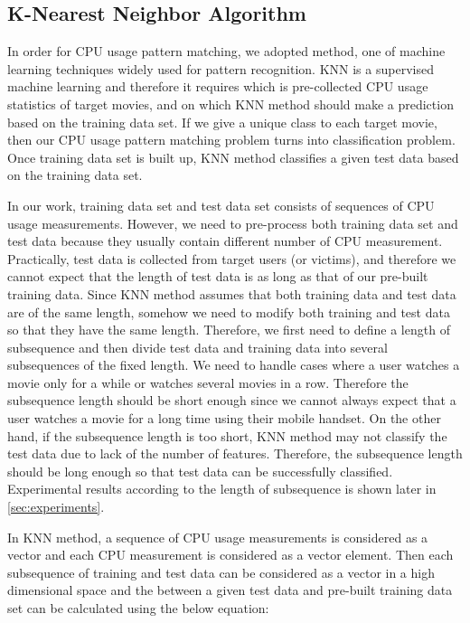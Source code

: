 \subsection{K-Nearest Neighbor Algorithm}
\label{sec:knn} 

In order for CPU usage pattern matching, we adopted  method, one of machine learning techniques widely used for pattern recognition.
KNN is a supervised machine learning and therefore it requires  which is pre-collected CPU usage statistics of target movies, and  on which KNN method should make a prediction based on the training data set.
If we give a unique class to each target movie, then our CPU usage pattern matching problem turns into classification problem. 
Once training data set is built up,  KNN method classifies a given test data based on the training data set. 

In our work, training data set and test data set consists of sequences of CPU usage measurements. 
However, we need to pre-process both training data set and test data because they usually contain different number of CPU measurement.
Practically, test data is collected from target users (or victims), and therefore we cannot expect that the length of test data is as long as that of our pre-built training data. 
Since KNN method assumes that both training data and test data are of the same length, somehow we need to modify both training and test data so that they have the same length. 
Therefore, we first need to define a length of subsequence and then divide test data and training data into several subsequences of the fixed length. 
We need to handle cases where a user watches a movie only for a while or watches several movies in a row. 
Therefore the subsequence length should be short enough since we cannot always expect that a user watches a movie for a long time using their mobile handset.  
On the other hand, if the subsequence length is too short, KNN method may not classify the test data due to lack of the number of features. 
Therefore, the subsequence length should be long enough so that test data can be successfully classified. 
Experimental results according to the length of subsequence is shown later in \ref{sec:experiments}.

In KNN method, a sequence of CPU usage measurements is considered as a vector and each CPU measurement is considered as a vector element. 
Then each subsequence of training and test data can be considered as a vector in a high dimensional space and the  between a given test data and pre-built training data set can be calculated using the below equation: 


